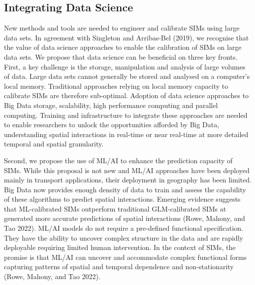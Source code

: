 \documentclass[11pt,letterpaper]{article}
\begin{document}
\hypertarget{integrating-data-science}{%
\subsection{Integrating Data Science}\label{integrating-data-science}}

New methods and tools are needed to engineer and calibrate SIMs using large data sets.
In agreement with Singleton and Arribas-Bel (2019), we recognise that the value of data science approaches to enable the calibration of SIMs on large data sets.
We propose that data science can be beneficial on three key fronts.
First, a key challenge is the storage, manipulation and analysis of large volumes of data.
Large data sets cannot generally be stored and analysed on a computer's local memory.
Traditional approaches relying on local memory capacity to calibrate SIMs are therefore sub-optimal.
Adoption of data science approaches to Big Data storage, scalability, high performance computing and parallel computing.
Training and infrastructure to integrate these approaches are needed to enable researchers to unlock the opportunities afforded by Big Data, understanding spatial interactions in real-time or near real-time at more detailed temporal and spatial granularity.

Second, we propose the use of ML/AI to enhance the prediction capacity of SIMs.
While this proposal is not new and ML/AI approaches have been deployed mainly in transport applications, their deployment in geography has been limited.
Big Data now provides enough density of data to train and assess the capability of these algorithms to predict spatial interactions.
Emerging evidence suggests that ML-calibrated SIMs outperform traditional GLM-calibrated SIMs at generated more accurate predictions of spatial interactions (Rowe, Mahony, and Tao 2022).
ML/AI models do not require a pre-defined functional specification.
They have the ability to uncover complex structure in the data and are rapidly deployable requiring limited human intervention.
In the context of SIMs, the promise is that ML/AI can uncover and accommodate complex functional forms capturing patterns of spatial and temporal dependence and non-stationarity (Rowe, Mahony, and Tao 2022).
\end{document}
